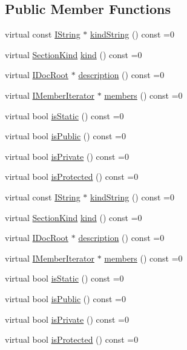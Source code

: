 \subsection*{Public Member Functions}
\begin{DoxyCompactItemize}
\item 
virtual const \mbox{\hyperlink{class_i_string}{I\+String}} $\ast$ \mbox{\hyperlink{class_i_section_ad4027ec4d324a2ee4987f3216e225fdb}{kind\+String}} () const =0
\item 
virtual \mbox{\hyperlink{class_i_section_af768cbfe7056fadbd0a67d26d0ef84e5}{Section\+Kind}} \mbox{\hyperlink{class_i_section_a3610cc0bc9b90608ade62b84a750ddb4}{kind}} () const =0
\item 
virtual \mbox{\hyperlink{class_i_doc_root}{I\+Doc\+Root}} $\ast$ \mbox{\hyperlink{class_i_section_a7ebb511c977fa668611481272c97e23d}{description}} () const =0
\item 
virtual \mbox{\hyperlink{class_i_member_iterator}{I\+Member\+Iterator}} $\ast$ \mbox{\hyperlink{class_i_section_a1980a8501eb0adbc12f00e251210c39e}{members}} () const =0
\item 
virtual bool \mbox{\hyperlink{class_i_section_a8fb73cfd6c2d057b32ce07a89700ecef}{is\+Static}} () const =0
\item 
virtual bool \mbox{\hyperlink{class_i_section_a09f6dd61327d0cf67404cde8476be7a1}{is\+Public}} () const =0
\item 
virtual bool \mbox{\hyperlink{class_i_section_ad205fa5a5150643b8275f3f4ef3759d8}{is\+Private}} () const =0
\item 
virtual bool \mbox{\hyperlink{class_i_section_afdd0506cd65ce59c8fecc060ef813592}{is\+Protected}} () const =0
\item 
virtual const \mbox{\hyperlink{class_i_string}{I\+String}} $\ast$ \mbox{\hyperlink{class_i_section_ad4027ec4d324a2ee4987f3216e225fdb}{kind\+String}} () const =0
\item 
virtual \mbox{\hyperlink{class_i_section_af768cbfe7056fadbd0a67d26d0ef84e5}{Section\+Kind}} \mbox{\hyperlink{class_i_section_a3610cc0bc9b90608ade62b84a750ddb4}{kind}} () const =0
\item 
virtual \mbox{\hyperlink{class_i_doc_root}{I\+Doc\+Root}} $\ast$ \mbox{\hyperlink{class_i_section_a7ebb511c977fa668611481272c97e23d}{description}} () const =0
\item 
virtual \mbox{\hyperlink{class_i_member_iterator}{I\+Member\+Iterator}} $\ast$ \mbox{\hyperlink{class_i_section_a1980a8501eb0adbc12f00e251210c39e}{members}} () const =0
\item 
virtual bool \mbox{\hyperlink{class_i_section_a8fb73cfd6c2d057b32ce07a89700ecef}{is\+Static}} () const =0
\item 
virtual bool \mbox{\hyperlink{class_i_section_a09f6dd61327d0cf67404cde8476be7a1}{is\+Public}} () const =0
\item 
virtual bool \mbox{\hyperlink{class_i_section_ad205fa5a5150643b8275f3f4ef3759d8}{is\+Private}} () const =0
\item 
virtual bool \mbox{\hyperlink{class_i_section_afdd0506cd65ce59c8fecc060ef813592}{is\+Protected}} () const =0
\end{DoxyCompactItemize}


